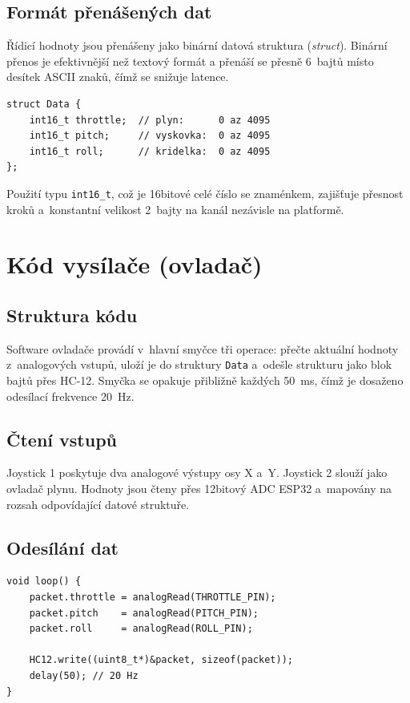 \documentclass[12pt, a4paper, oneside]{report}
\begin{document}
\subsection{Formát přenášených dat}

Řídicí hodnoty jsou přenášeny jako binární datová struktura
(\textit{struct}). Binární přenos je efektivnější než textový formát a přenáší se přesně 6~bajtů místo desítek ASCII znaků,
čímž se snižuje latence.

\begin{lstlisting}[style=c_style, caption={Datová struktura řídicího paketu.}]
struct Data {
    int16_t throttle;  // plyn:      0 az 4095
    int16_t pitch;     // vyskovka:  0 az 4095
    int16_t roll;      // kridelka:  0 az 4095
};
\end{lstlisting}

Použití typu \texttt{int16\_t}, což je 16bitové celé číslo se znaménkem,
zajišťuje přesnost kroků a~konstantní velikost 2~bajty
na kanál nezávisle na platformě.

\section{Kód vysílače (ovladač)}

\subsection{Struktura kódu}

Software ovladače provádí v~hlavní smyčce tři operace: přečte aktuální
hodnoty z~analogových vstupů, uloží je do struktury \texttt{Data}
a~odešle strukturu jako blok bajtů přes HC-12. Smyčka se opakuje
přibližně každých 50~ms, čímž je dosaženo odesílací frekvence 20~Hz.

\subsection{Čtení vstupů}

Joystick 1 poskytuje dva analogové výstupy osy X a~Y. Joystick 2 slouží jako ovladač plynu. Hodnoty jsou
čteny přes 12bitový ADC ESP32 a~mapovány na rozsah odpovídající
datové struktuře.

\subsection{Odesílání dat}

\begin{lstlisting}[style=c_style, caption={Odesílání paketu z ovladače.}]
void loop() {
    packet.throttle = analogRead(THROTTLE_PIN);
    packet.pitch    = analogRead(PITCH_PIN);
    packet.roll     = analogRead(ROLL_PIN);

    HC12.write((uint8_t*)&packet, sizeof(packet));
    delay(50); // 20 Hz
}
\end{lstlisting}
\end{document}
